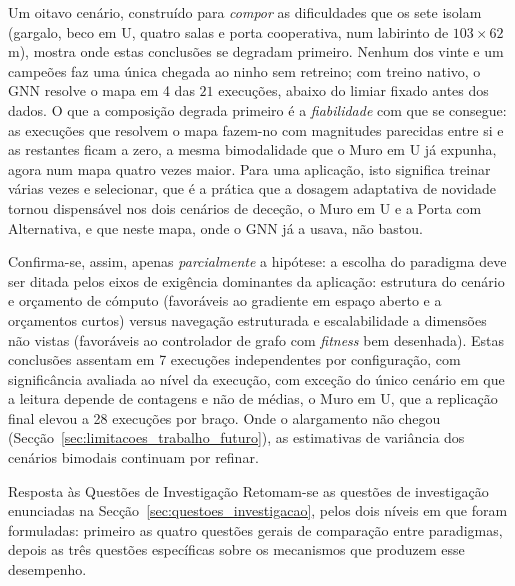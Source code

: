 \documentclass[12pt,reqno, twoside]{amsbook}
\makeatletter
\def\section{\@startsection{section}{1}%
      \z@{.5\linespacing\@plus.7\linespacing}{.25\linespacing}%
      {\normalfont\bfseries\flushleft}}
\theoremstyle{plain}
\numberwithin{equation}{chapter}
\numberwithin{section}{chapter}
\numberwithin{table}{chapter}
\numberwithin{figure}{chapter}
\makeatother
\begin{document}
Um oitavo cenário, construído para \emph{compor} as dificuldades que os sete
isolam (gargalo, beco em U, quatro salas e porta cooperativa, num labirinto
de $103 \times 62$\,m), mostra onde estas conclusões se degradam primeiro.
Nenhum dos vinte e um campeões faz uma única chegada ao ninho sem retreino; com treino
nativo, o GNN resolve o mapa em 4 das $21$
execuções, abaixo do limiar fixado antes dos dados. O que a composição degrada
primeiro é a \emph{fiabilidade} com que se consegue: as execuções que
resolvem o mapa fazem-no com magnitudes parecidas entre si e as restantes
ficam a zero, a mesma bimodalidade que o Muro em U já expunha, agora num mapa
quatro vezes maior. Para uma aplicação, isto significa treinar várias vezes e
selecionar, que é a prática que a dosagem adaptativa de novidade
tornou dispensável nos dois cenários de deceção, o Muro em U e a Porta com
Alternativa, e que neste mapa, onde o GNN já a usava, não bastou.


Confirma-se, assim, apenas \emph{parcialmente} a hipótese: a escolha do paradigma deve ser ditada pelos eixos de exigência dominantes da aplicação: estrutura do cenário e orçamento de cómputo (favoráveis ao gradiente em espaço aberto e a orçamentos curtos) versus navegação estruturada e escalabilidade a dimensões não vistas (favoráveis ao controlador de grafo com \textit{fitness} bem desenhada). Estas conclusões assentam em 7 execuções independentes por configuração, com significância avaliada ao nível da execução, com exceção do único cenário em que a leitura depende de contagens e não de médias, o Muro em U, que a replicação final elevou a 28 execuções por braço. Onde o alargamento não chegou (Secção~\ref{sec:limitacoes_trabalho_futuro}), as estimativas de variância dos cenários bimodais continuam por refinar.

\section{Resposta às Questões de Investigação}
\label{sec:resposta_qi}
Retomam-se as questões de investigação enunciadas na Secção~\ref{sec:questoes_investigacao}, pelos dois níveis em que foram formuladas: primeiro as quatro questões gerais de comparação entre paradigmas, depois as três questões específicas sobre os mecanismos que produzem esse desempenho.
\end{document}
